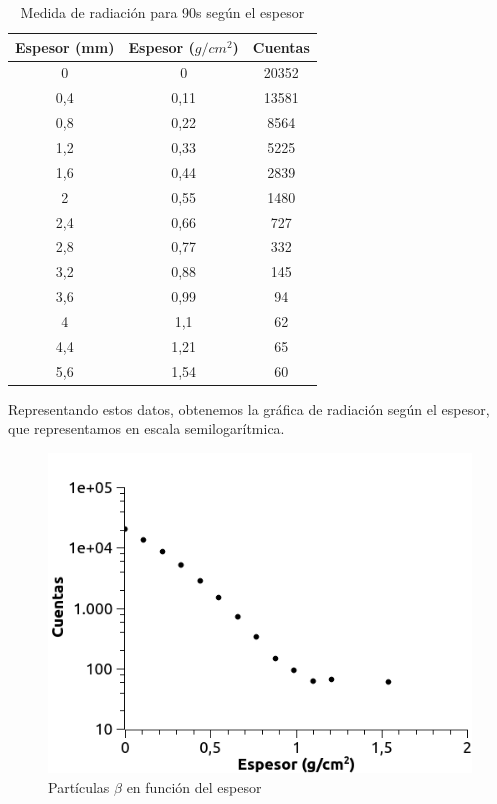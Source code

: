 \documentclass[a4paper,12pt,spanish]{article}
\begin{document}
	\begin{table}[H]
		\centering
		\begin{tabular}{|c|c|c|}
			\hline
			Espesor (mm) & Espesor ($\si{g/cm^2}$) & Cuentas \\ \hline\hline
			0            & 0                     & 20352   \\ \hline
			0,4          & 0,11                  & 13581   \\ \hline
			0,8          & 0,22                  & 8564    \\ \hline
			1,2          & 0,33                  & 5225    \\ \hline
			1,6          & 0,44                  & 2839    \\ \hline
			2            & 0,55                  & 1480    \\ \hline
			2,4          & 0,66                  & 727     \\ \hline
			2,8          & 0,77                  & 332     \\ \hline
			3,2          & 0,88                  & 145     \\ \hline
			3,6          & 0,99                  & 94      \\ \hline
			4            & 1,1                   & 62      \\ \hline
			4,4          & 1,21                  & 65      \\ \hline
			5,6          & 1,54                  & 60      \\ \hline
		\end{tabular}
		\caption{Medida de radiación para 90s según el espesor}
	\end{table}
	
	
	Representando estos datos, obtenemos la gráfica de radiación según el espesor, que representamos en escala semilogarítmica.
	
\begin{figure}[H]
	\centering
	\includegraphics[width=0.7\linewidth]{imagenes/grafica_log_1-2}
	\caption{Partículas $\beta$ en función del espesor}
	\label{fig:graficalog1-2}
\end{figure}
	
\end{document}
